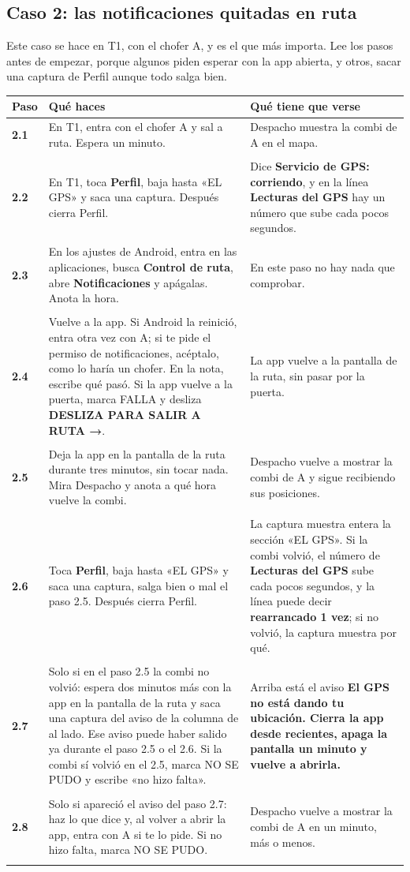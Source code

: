 \documentclass[10pt,a4paper]{article}
\makeatletter
\newcommand{\toca}[1]{\textcolor{azul}{\textbf{#1}}}
\newcommand{\pantalla}[1]{\textcolor{marron}{\textbf{#1}}}
\newcommand{\nada}{\textcolor{tenue}{En este paso no hay nada que comprobar.}}
\newcommand{\caja}[2]{\hbox{\vrule height #1 depth 0pt width 0pt #2}}
\newcommand{\campo}[3]{%
  \raisebox{-0.35\height}{\caja{#3}{\TextField[name=#1, width=#2, height=#3, charsize=8pt, bordercolor={0.55 0.6 0.68},
    backgroundcolor={0.965 0.976 0.992}, multiline=true]{}}}}
\newcommand{\resultado}[1]{%
  \caja{9pt}{\ChoiceMenu[radio, name=resultado-#1, width=9pt, height=9pt, radiosymbol=l,
    bordercolor={0.35 0.38 0.45}, default=]{}{OK=ok,FALLA=falla,NO SE PUDO=nopudo}}}
\newcommand{\paso}[4]{%
  \textbf{#1} & #3 & #4 \\*
  \multicolumn{3}{@{\hspace{6pt}}l@{}}{\rule{0pt}{15pt}\small
    \resultado{#2}\hspace{0.4em}Hora:~\campo{hora-#2}{1.7cm}{13pt}\hspace{1.2em}Nota:~\campo{nota-#2}{8.3cm}{22pt}}\\[3pt]
  \hline
}
\newenvironment{pasos}{%
  \begin{longtable}{@{\hspace{6pt}}>{\raggedright\arraybackslash}p{0.9cm}>{\raggedright\arraybackslash}p{7.9cm}>{\raggedright\arraybackslash}p{7.3cm}@{}}
  \rowcolor{cabecera}\textbf{Paso} & \textbf{Qué haces} & \textbf{Qué tiene que verse} \\ \hline
  \endhead
}{\end{longtable}\vspace{-0.6em}}
\makeatother
\begin{document}
\begin{Form}
\section{Caso 2: las notificaciones quitadas en ruta}

Este caso se hace en T1, con el chofer A, y es el que más importa. Lee los pasos antes de empezar, porque algunos piden esperar con la app abierta, y otros, sacar una captura de Perfil aunque todo salga bien.

\begin{pasos}
\paso{2.1}{2-1}{En T1, entra con el chofer A y sal a ruta. Espera un minuto.}{Despacho muestra la combi de A en el mapa.}
\paso{2.2}{2-2}{En T1, toca \toca{Perfil}, baja hasta «EL GPS» y saca una captura. Después cierra Perfil.}{Dice \pantalla{Servicio de GPS: corriendo}, y en la línea \pantalla{Lecturas del GPS} hay un número que sube cada pocos segundos.}
\paso{2.3}{2-3}{En los ajustes de Android, entra en las aplicaciones, busca \toca{Control de ruta}, abre \toca{Notificaciones} y apágalas. Anota la hora.}{\nada}
\paso{2.4}{2-4}{Vuelve a la app. Si Android la reinició, entra otra vez con A; si te pide el permiso de notificaciones, acéptalo, como lo haría un chofer. En la nota, escribe qué pasó. Si la app vuelve a la puerta, marca FALLA y desliza \toca{DESLIZA PARA SALIR A RUTA →}.}{La app vuelve a la pantalla de la ruta, sin pasar por la puerta.}
\paso{2.5}{2-5}{Deja la app en la pantalla de la ruta durante tres minutos, sin tocar nada. Mira Despacho y anota a qué hora vuelve la combi.}{Despacho vuelve a mostrar la combi de A y sigue recibiendo sus posiciones.}
\paso{2.6}{2-6}{Toca \toca{Perfil}, baja hasta «EL GPS» y saca una captura, salga bien o mal el paso 2.5. Después cierra Perfil.}{La captura muestra entera la sección «EL GPS». Si la combi volvió, el número de \pantalla{Lecturas del GPS} sube cada pocos segundos, y la línea puede decir \pantalla{rearrancado 1 vez}; si no volvió, la captura muestra por qué.}
\paso{2.7}{2-7}{Solo si en el paso 2.5 la combi no volvió: espera dos minutos más con la app en la pantalla de la ruta y saca una captura del aviso de la columna de al lado. Ese aviso puede haber salido ya durante el paso 2.5 o el 2.6. Si la combi sí volvió en el 2.5, marca NO SE PUDO y escribe «no hizo falta».}{Arriba está el aviso \pantalla{El GPS no está dando tu ubicación. Cierra la app desde recientes, apaga la pantalla un minuto y vuelve a abrirla.}}
\paso{2.8}{2-8}{Solo si apareció el aviso del paso 2.7: haz lo que dice y, al volver a abrir la app, entra con A si te lo pide. Si no hizo falta, marca NO SE PUDO.}{Despacho vuelve a mostrar la combi de A en un minuto, más o menos.}

\end{pasos}
\end{Form}
\end{document}

